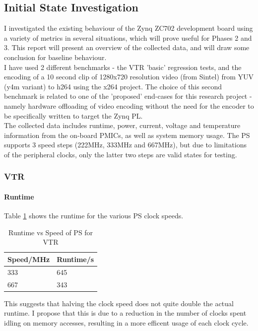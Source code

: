 \documentclass[a4paper]{article}
\begin{document}
  \subsection{Initial State Investigation}

  I investigated the existing behaviour of the Zynq ZC702 development board using a variety of metrics in several situations, which will prove useful for Phases 2 and 3.
  This report will present an overview of the collected data, and will draw some conclusion for baseline behaviour.\\
  I have used 2 different benchmarks - the VTR 'basic' regression tests, and the encoding of a 10 second clip of 1280x720 resolution video (from Sintel) from YUV (y4m variant) to h264 using the x264 project.
  The choice of this second benchmark is related to one of the 'proposed' end-cases for this research project - namely hardware offloading of video encoding without the need for the encoder to be specifically written to target the Zynq PL.\\
  The collected data includes runtime, power, current, voltage and temperature information from the on-board PMICs, as well as system memory usage. The PS supports 3 speed steps (222MHz, 333MHz and 667MHz), but due to limitations of the peripheral clocks, only the latter two steps are valid states for testing.

\subsubsection{VTR}
  \paragraph{Runtime}
    Table \ref{tab:vtr:rt} shows the runtime for the various PS clock speeds.
    \begin{table}[tbp]
      \centering
      \begin{tabular}{l | l}
        Speed/MHz & Runtime/s \\
        \hline
        333 & 645 \\
        667 & 343 \\
      \end{tabular}
      \caption{Runtime vs Speed of PS for VTR}
      \label{tab:vtr:rt}
    \end{table}
    This suggests that halving the clock speed does not quite double the actual runtime. I propose that this is due to a reduction in the number of clocks spent idling on memory accesses, resulting in a more efficent usage of each clock cycle.
\end{document}

